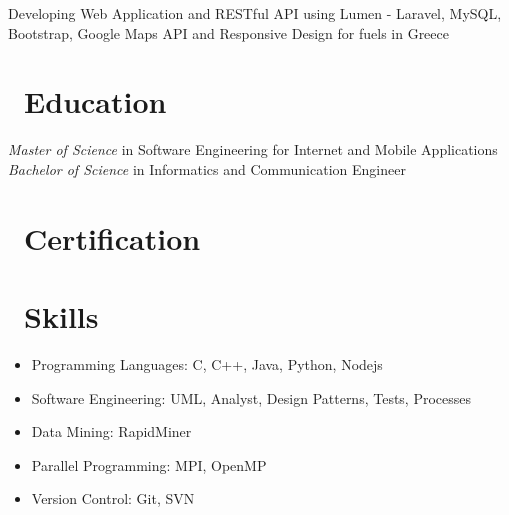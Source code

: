 \documentclass{resume}
\begin{document}
Developing Web Application and RESTful API using Lumen - Laravel, MySQL, Bootstrap, Google Maps API and Responsive Design for fuels in Greece

\section{\faGraduationCap\ Education}
\textit{Master of Science} in Software Engineering for Internet and Mobile Applications
\textit{Bachelor of Science} in Informatics and Communication Engineer

\section{\faCertificate\ Certification}


\section{\faCogs\ Skills}
\begin{itemize}[parsep=0.5ex]
  \item Programming Languages: C, C++, Java, Python, Nodejs
  \item Software Engineering: UML, Analyst, Design Patterns, Tests, Processes
  \item Data Mining: RapidMiner
  \item Parallel Programming: MPI, OpenMP
  \item Version Control: Git, SVN
\end{itemize}
\end{document}

